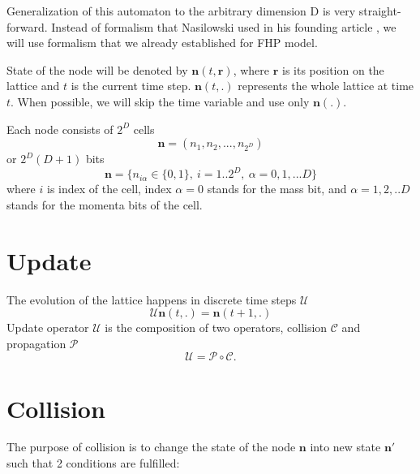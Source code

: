 Generalization of this automaton to the arbitrary dimension D is very straight-forward. Instead of formalism that Nasilowski used in his founding article \cite{nasilowski}, we will use formalism that we already established for FHP model.

State of the node will be denoted by $\bm{n}(t,\bm{r})$, where $\bm{r}$ is its position on the lattice and $t$ is the current time step. $\bm{n}(t,.)$ represents the whole lattice at time $t$. When possible, we will skip the time variable and use only $\bm{n}(.)$.

Each node consists of $2^D$ cells
\begin{equation}
\bm{n} = (n_1, n_2, ... , n_{2^D})
\end{equation}
or $2^D(D+1)$ bits
\begin{equation}
\bm{n} = \big\{ n_{i\alpha} \in \big\{0,1\big\},~i = 1..2^D, ~\alpha = 0,1,...D\big\}
\end{equation}
where $i$ is index of the cell, index $\alpha = 0$ stands for the mass bit, and $\alpha = 1,2,..D$ stands for the momenta bits of the cell.

\section{Update}
The evolution of the lattice happens in discrete time steps $\mathcal{U}$
\begin{equation}
\mathcal{U} \bm{n}(t,.) = \bm{n}(t+1,.)
\end{equation} 
Update operator $\mathcal{U}$ is the composition of two operators, collision $\mathcal{C}$ and propagation $\mathcal{P}$
\begin{equation}
\mathcal{U} = \mathcal{P} \circ \mathcal{C}.
\end{equation} 

\section{Collision}

The purpose of collision is to change the state of the node $\bm{n}$ into new state $\bm{n'}$ such that 2 conditions are fulfilled:


